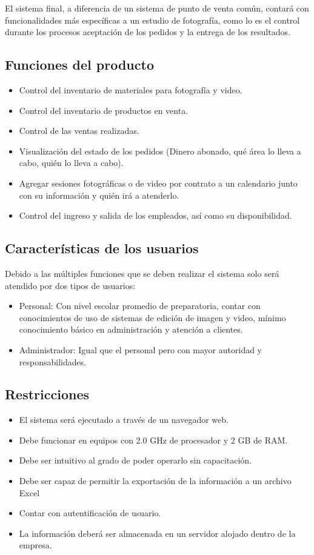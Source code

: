 El sistema final, a diferencia de un sistema de punto de venta común, contará con funcionalidades más específicas a un estudio de fotografía, como lo es el control durante los procesos aceptación de los pedidos y la entrega de los resultados.

\subsection{Funciones del producto}
\begin{itemize}
\item Control del inventario de materiales para fotografía y video.
\item Control del inventario de productos en venta.
\item Control de las ventas realizadas.
\item Visualización del estado de los pedidos (Dinero abonado, qué área lo lleva a cabo, quién lo lleva a cabo).
\item Agregar sesiones fotográficas o de video por contrato a un calendario junto con su información y quién irá a atenderlo.
\item Control del ingreso y salida de los empleados, así como su disponibilidad.
\end{itemize}

\subsection{Características de los usuarios}

Debido a las múltiples funciones que se deben realizar el sistema solo será atendido por dos tipos de usuarios:
\begin{itemize}
\item Personal: Con nivel escolar promedio de preparatoria, contar con conocimientos de uso de sistemas de edición de imagen y video, mínimo conocimiento básico en administración y atención a clientes.
\item Administrador: Igual que el personal pero con mayor autoridad y responsabilidades.	
\end{itemize}

\subsection{Restricciones}
\begin{itemize}
\item El sistema será ejecutado a través de un navegador web.
\item Debe funcionar en equipos con 2.0 GHz de procesador y 2 GB de RAM.
\item Debe ser intuitivo al grado de poder operarlo sin capacitación.
\item Debe ser capaz de permitir la exportación de la información a un archivo Excel
\item Contar con autentificación de usuario.
\item La información deberá ser almacenada en un servidor alojado dentro de la empresa.
\end{itemize}

